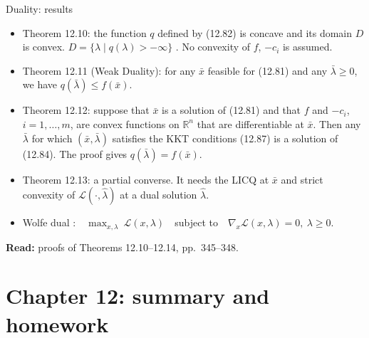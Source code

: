 \documentclass[aspectratio=169,12pt]{beamer}
\newcommand{\R}{\mathbb{R}}
\newcommand{\eqn}[1]{\text{\small(#1)}}
\newcommand{\readbook}[1]{{\color{red}\textbf{Read:} #1}}
\newcommand{\cL}{\mathcal{L}}
\begin{document}
\begin{frame}{Duality: results}
  \begin{itemize}\setlength\itemsep{0.25em}
    \item Theorem 12.10: the function $q$ defined by (12.82) is concave and its domain $D$ is convex.
      $D=\{\lambda\mid q(\lambda)>-\infty\}$ \eqn{12.83}. No convexity of $f$, $-c_{i}$ is assumed.
    \item Theorem 12.11 (Weak Duality): for any $\bar x$ feasible for (12.81) and any $\bar\lambda\ge 0$,
      we have $q(\bar\lambda)\le f(\bar x)$.
    \item Theorem 12.12: suppose that $\bar x$ is a solution of (12.81) and that $f$ and $-c_{i}$,
      $i=1,\dots,m$, are convex functions on $\R^{n}$ that are differentiable at $\bar x$. Then any
      $\bar\lambda$ for which $(\bar x,\bar\lambda)$ satisfies the KKT conditions (12.87) is a solution
      of (12.84). The proof gives $q(\bar\lambda)=f(\bar x)$.
    \item Theorem 12.13: a partial converse. It needs the LICQ at $\bar x$ and strict convexity
      of $\cL(\cdot,\hat\lambda)$ at a dual solution $\hat\lambda$.
    \item Wolfe dual \eqn{12.88}:\ \
      $\max_{x,\lambda}\ \cL(x,\lambda)$\ \ subject to\ \ $\nabla_{x}\cL(x,\lambda)=0,\ \lambda\ge 0$.
  \end{itemize}
  \readbook{proofs of Theorems 12.10--12.14, pp.~345--348.}
\end{frame}

\section{Chapter 12: summary and homework}
\end{document}
